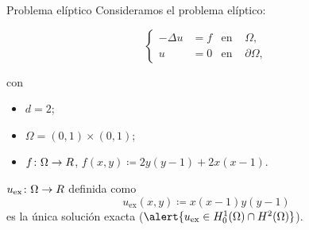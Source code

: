 	\begin{frame}{Problema elíptico}
		Consideramos el problema elíptico:
		\begin{block}{}
		\begin{equation*}
		\left\{
		\begin{aligned}
		-\Delta u&=f & \text{en } &\Omega, \\
		u&=0 & \text{en } &\partial\Omega,
		\end{aligned}
		\right.
		\end{equation*}
		\end{block}
		con
		\begin{itemize}
			\item $d=2$;
			\item $\Omega=(0,1)\times(0,1)$;
			\item $f\colon\Omega\to\relax R$, $f(x,y)\coloneqq2y(y-1) + 2x(x-1)$.
		\end{itemize}
		\vspace*{0.3cm}
		
		$u_{\text{ex}}\colon\Omega\to\relax R$ definida como
		\begin{equation*}
		\label{sol_experimento_eliptico}
		u_{\text{ex}}(x,y)\coloneqq x(x-1)y(y-1)
		\end{equation*}
		es la \alert{única solución exacta} ($\alert{u_{\text{ex}}\in H_0^1(\Omega)\cap H^2(\Omega)}$).
		\end{frame}

